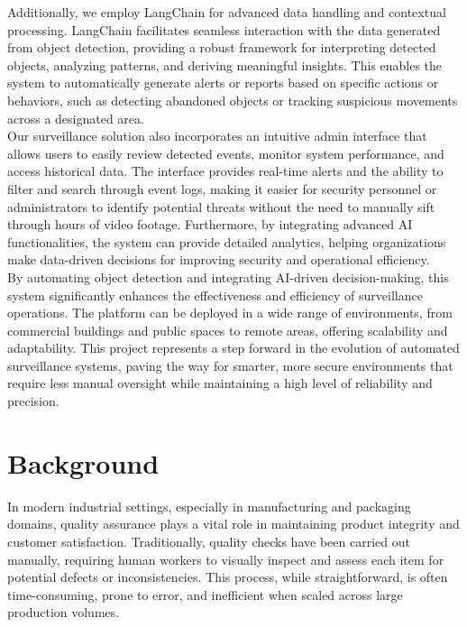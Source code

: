 \documentclass[12pt]{report}
\begin{document}
Additionally, we employ LangChain for advanced data handling and contextual processing. LangChain facilitates seamless interaction with the data generated from object detection, providing a robust framework for interpreting detected objects, analyzing patterns, and deriving meaningful insights. This enables the system to automatically generate alerts or reports based on specific actions or behaviors, such as detecting abandoned objects or tracking suspicious movements across a designated area.\\

Our surveillance solution also incorporates an intuitive admin interface that allows users to easily review detected events, monitor system performance, and access historical data. The interface provides real-time alerts and the ability to filter and search through event logs, making it easier for security personnel or administrators to identify potential threats without the need to manually sift through hours of video footage. Furthermore, by integrating advanced AI functionalities, the system can provide detailed analytics, helping organizations make data-driven decisions for improving security and operational efficiency.\\

By automating object detection and integrating AI-driven decision-making, this system significantly enhances the effectiveness and efficiency of surveillance operations. The platform can be deployed in a wide range of environments, from commercial buildings and public spaces to remote areas, offering scalability and adaptability. This project represents a step forward in the evolution of automated surveillance systems, paving the way for smarter, more secure environments that require less manual oversight while maintaining a high level of reliability and precision.

 




\section{Background}

In modern industrial settings, especially in manufacturing and packaging domains, quality assurance plays a vital role in maintaining product integrity and customer satisfaction. Traditionally, quality checks have been carried out manually, requiring human workers to visually inspect and assess each item for potential defects or inconsistencies. This process, while straightforward, is often time-consuming, prone to error, and inefficient when scaled across large production volumes.
\end{document}
